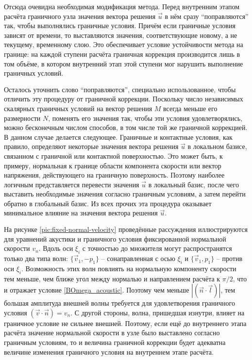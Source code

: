 Отсюда очевидна необходимая модификация метода. Перед внутренним этапом расчёта 
граничного узла значения вектора решения $\vec{u}$ в нём сразу ``поправляются'' так, чтобы выполнялись 
граничные условия. Причём если граничные условия зависят от времени, то выставляются 
значения, соответствующие новому, а не текущему, временному слою. Это обеспечивает условие 
устойчивости метода на границе: на каждой ступени расчёта граничная коррекция производится лишь в том 
объёме, в котором внутренний этап этой ступени мог нарушить выполнение граничных условий.

Осталось уточнить слово ``поправляются'', специально использованное, 
чтобы отличить эту процедуру от граничной коррекции. 
Поскольку число независимых скалярных граничных условий на вектор решения $M$
всегда меньше его размерности $N$, поменять его значения так, чтобы эти условия  
удовлетворялись, можно бесконечным числом способов, 
в том числе той же граничной коррекцией. В данном случае делается следующее. 
Граничные и контактные условия, как правило, определяют некоторые значения 
вектора решения $\vec{u}$ в локальном базисе, связанном с граничной или контактной поверхностью. 
Это может быть, к примеру, нормальная к границе области компонента скорости или 
вектор напряжения, действующего на граничную поверхность. Поэтому наиболее логичным 
представляется перевести значения $\vec{u}$ в локальный базис, после чего 
выставить необходимые значения согласно граничным условиям, а затем перейти 
обратно в глобальный базис. Из всех прочих эта процедура 
оказывает минимальное влияние на значения вектора решения $\vec{u}$. 

На рисунке \ref{pic:fixed-normal-velocity} проведённые рассуждения иллюстрируются для 
уравнений акустики и граничного условия фиксированной нормальной скорости $v_n$. 
Вдоль оси $\xi_i$ с точностью до множителя могут распространятся только два типа волн:
$\{ \vec{v}_1, - p_1 \}$ -- сонаправленная с осью $\xi_i$ и 
$\{ \vec{v}_1, p_1 \}$ -- против оси $\xi_i$. 
Возможность этих волн повлиять на нормальную компоненту скорости тем меньше, чем 
ближе угол между нормалью и направлением расчёта к $\pi/2$, что и отражает условие 
\ref{BOmega_acoustic}. Поэтому чем меньше $|(\vec{n} \cdot \vec{l})|$, тем большая амплитуда 
внешней волны требуется для удовлетворения граничного условия $(\vec{v} \cdot \vec{n}) = v_n$. 
С другой стороны, волна, пришедшая изнутри, влияет на граничное условие не сильнее внешней. 
Поэтому, если ещё до внутреннего этапа расчёта значение нормальной скорости в узле 
было выставлено согласно граничным условиям, то и величина граничной коррекции будет 
адекватна величине изменения граничного условия на внутреннем этапе расчёта.

